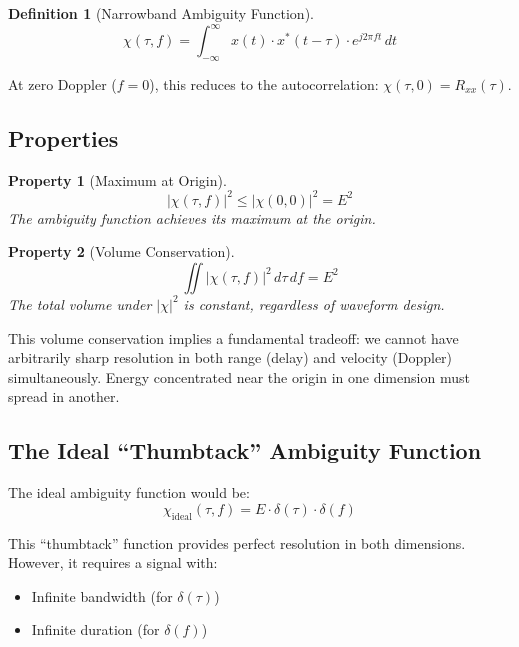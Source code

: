 \documentclass[11pt]{article}
\newtheorem{definition}{Definition}
\newtheorem{property}{Property}
\begin{document}
\begin{definition}[Narrowband Ambiguity Function]
\begin{equation}
\chi(\tau, f) = \int_{-\infty}^{\infty} x(t) \cdot x^*(t - \tau) \cdot e^{j2\pi f t} \, dt
\end{equation}
\end{definition}

At zero Doppler ($f = 0$), this reduces to the autocorrelation: $\chi(\tau, 0) = R_{xx}(\tau)$.

\subsection{Properties}

\begin{property}[Maximum at Origin]
\begin{equation}
|\chi(\tau, f)|^2 \leq |\chi(0, 0)|^2 = E^2
\end{equation}
The ambiguity function achieves its maximum at the origin.
\end{property}

\begin{property}[Volume Conservation]
\begin{equation}
\iint |\chi(\tau, f)|^2 \, d\tau \, df = E^2
\end{equation}
The total volume under $|\chi|^2$ is constant, regardless of waveform design.
\end{property}

This volume conservation implies a fundamental tradeoff: we cannot have arbitrarily sharp resolution in both range (delay) and velocity (Doppler) simultaneously. Energy concentrated near the origin in one dimension must spread in another.

\subsection{The Ideal ``Thumbtack'' Ambiguity Function}

The ideal ambiguity function would be:
\begin{equation}
\chi_{\text{ideal}}(\tau, f) = E \cdot \delta(\tau) \cdot \delta(f)
\end{equation}

This ``thumbtack'' function provides perfect resolution in both dimensions. However, it requires a signal with:
\begin{itemize}
    \item Infinite bandwidth (for $\delta(\tau)$)
    \item Infinite duration (for $\delta(f)$)
\end{itemize}
\end{document}
